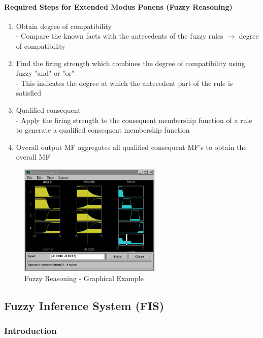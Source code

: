 \documentclass{tron}
\begin{document}
\paragraph{Required Steps for Extended Modus Ponens (Fuzzy Reasoning)}
\begin{enumerate}
	\item Obtain degree of compatibility \\
		- Compare the known facts with the antecedents of the fuzzy rules $\rightarrow$ degree of compatibility
	\item Find the firing strength which combines the degree of compatibility using fuzzy "and" or "or" \\
		- This indicates the degree at which the antecedent part of the rule is satisfied
	\item Qualified consequent \\
		- Apply the firing strength to the consequent membership function of a rule to generate a qualified consequent membership function
	\item Overall output MF aggregates all qualified consequent MF's to obtain the overall MF
\end{enumerate}
\begin{figure}[H]
	\centering
	\includegraphics[height=200px]{Figs/FuzzyInferencing/fuzzy-graphical}
	\caption{Fuzzy Reasoning - Graphical Example}
	\label{fig:fuzzy-inf:reasoning}
\end{figure}

\clearpage
\subsection{Fuzzy Inference System (FIS)}
\subsubsection{Introduction}
\end{document}
